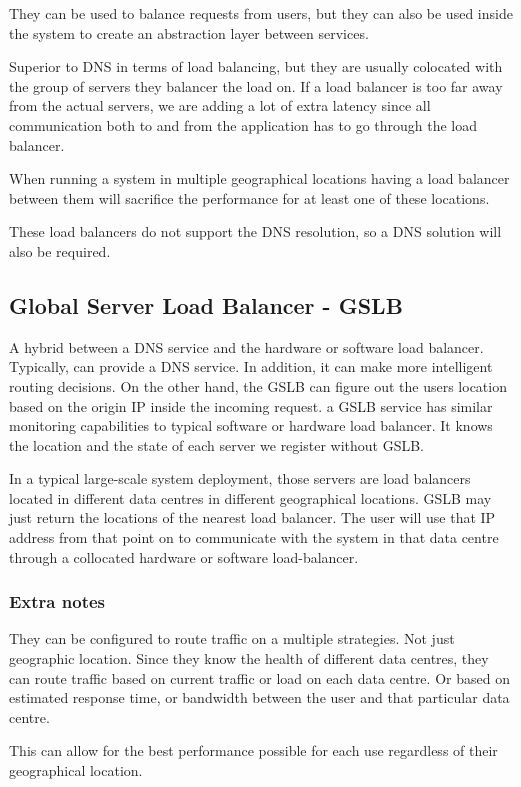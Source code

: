 They can be used to balance requests from users, but they can also be used inside the system to create an abstraction layer between services.

Superior to DNS in terms of load balancing, but they are usually colocated with the group of servers they balancer the load on.
If a load balancer is too far away from the actual servers, we are adding a lot of extra latency since all communication both to and from the application has to go through the load balancer.

When running a system in multiple geographical locations having a load balancer between them will sacrifice the performance for at least one of these locations.

These load balancers do not support the DNS resolution, so a DNS solution will also be required.

\subsection{Global Server Load Balancer - GSLB}
A hybrid between a DNS service and the hardware or software load balancer.
Typically, can provide a DNS service.
In addition, it can make more intelligent routing decisions.
On the other hand, the GSLB can figure out the users location based on the origin IP inside the incoming request.
a GSLB service has similar monitoring capabilities to typical software or hardware load balancer.
It knows the location and the state of each server we register without GSLB\@.

In a typical large-scale system deployment, those servers are load balancers located in different data centres in different geographical locations.
GSLB may just return the locations of the nearest load balancer.
The user will use that IP address from that point on to communicate with the system in that data centre through a collocated hardware or software load-balancer.

\subsubsection{Extra notes}
They can be configured to route traffic on a multiple strategies.
Not just geographic location.
Since they know the health of different data centres, they can route traffic based on current traffic or load on each data centre.
Or based on estimated response time, or bandwidth between the user and that particular data centre.

This can allow for the best performance possible for each use regardless of their geographical location.

